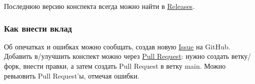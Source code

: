 \documentclass[a4paper,14pt]{extarticle}
\theoremstyle{definition}
\theoremstyle{plain}
\theoremstyle{plain}
\theoremstyle{plain}
\theoremstyle{plain}
\theoremstyle{definition}
\theoremstyle{definition}
\theoremstyle{definition}
\theoremstyle{definition}
\theoremstyle{definition}
\theoremstyle{definition}
\theoremstyle{definition}
\theoremstyle{definition}
\theoremstyle{definition}
\theoremstyle{definition}
\theoremstyle{definition}
\theoremstyle{plain}
\theoremstyle{plain}
\theoremstyle{plain}
\theoremstyle{plain}
\theoremstyle{definition}
\theoremstyle{definition}
\theoremstyle{definition}
\theoremstyle{definition}
\theoremstyle{definition}
\theoremstyle{definition}
\begin{document}
Последнюю версию конспекта всегда можно найти в \href{https://github.com/koreshaSp/matan2/releases}{\color{blue}Releases}.

\subsubsection*{Как внести вклад}
Об опечатках и ошибках можно сообщать, создав новую \href{https://github.com/koreshaSp/matan2/issues}{\color{blue}Issue} на GitHub.
Добавить в/улучшить конспект можно через \href{https://github.com/koreshaSp/matan2/pulls}{\color{blue}Pull Request}: нужно создать ветку/форк, внести правки, а затем создать Pull Request в ветку main.
Можно ревьювить Pull Request'ы, отмечая ошибки.

\newpage
\tableofcontents
\newpage














\end{document}
